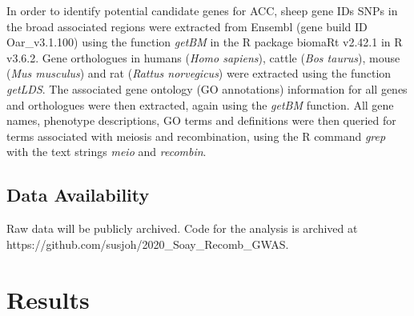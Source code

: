 \documentclass[a4paper,11pt]{article}
\begin{document}
In order to identify potential candidate genes for ACC, sheep gene IDs SNPs in the broad associated regions were extracted from Ensembl (gene build ID Oar\_v3.1.100) using the function \textit{getBM} in the R package biomaRt v2.42.1 \citep{Durinck2009} in R v3.6.2. Gene orthologues in humans (\textit{Homo sapiens}), cattle (\textit{Bos taurus}), mouse (\textit{Mus musculus}) and rat (\textit{Rattus norvegicus}) were extracted using the function \textit{getLDS}. The associated gene ontology (GO annotations) information for all genes and orthologues were then extracted, again using the \textit{getBM} function. All gene names, phenotype descriptions, GO terms and definitions were then queried for terms associated with meiosis and recombination, using the R command \textit{grep} with the text strings \textit{meio} and \textit{recombin}.

\subsection*{Data Availability}
Raw data will be publicly archived. Code for the analysis is archived at \\ https://github.com/susjoh/2020\_Soay\_Recomb\_GWAS.



\section*{Results}
\end{document}
